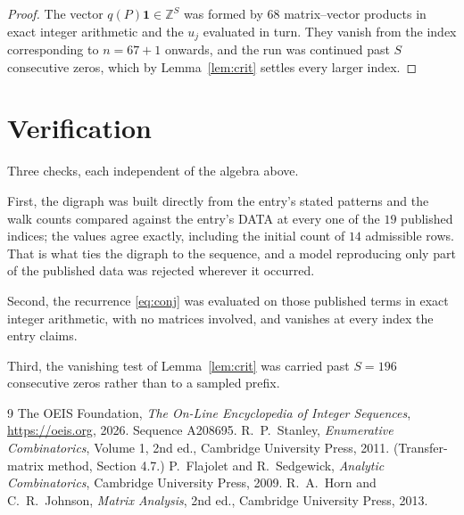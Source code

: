 \documentclass[11pt,a4paper]{article}
\theoremstyle{plain}
\theoremstyle{definition}
\begin{document}
\begin{proof}
The vector $q(P)\mathbf{1}\in\mathbb{Z}^{S}$ was formed by $68$ matrix--vector
products in exact integer arithmetic and the $u_j$ evaluated in turn. They vanish from the
index corresponding to $n=67+1$ onwards, and the run was continued past $S$ consecutive
zeros, which by Lemma~\ref{lem:crit} settles every larger index.
\end{proof}

\section{Verification}

Three checks, each independent of the algebra above.

First, the digraph was built directly from the entry's stated patterns and the walk counts
compared against the entry's DATA at every one of the $19$ published indices; the
values agree exactly, including the initial count of $14$ admissible rows. That is
what ties the digraph to the sequence, and a model reproducing only part of the published
data was rejected wherever it occurred.

Second, the recurrence \eqref{eq:conj} was evaluated on those published terms in exact
integer arithmetic, with no matrices involved, and vanishes at every index the entry claims.

Third, the vanishing test of Lemma~\ref{lem:crit} was carried past $S=196$ consecutive
zeros rather than to a sampled prefix.

\begin{thebibliography}{9}
 The OEIS Foundation, \emph{The On-Line Encyclopedia of Integer
Sequences}, \url{https://oeis.org}, 2026. Sequence A208695.
 R.~P.~Stanley, \emph{Enumerative Combinatorics}, Volume 1, 2nd ed.,
Cambridge University Press, 2011. (Transfer-matrix method, Section 4.7.)
 P.~Flajolet and R.~Sedgewick, \emph{Analytic Combinatorics}, Cambridge
University Press, 2009.
 R.~A.~Horn and C.~R.~Johnson, \emph{Matrix Analysis}, 2nd ed., Cambridge
University Press, 2013.
\end{thebibliography}
\end{document}
